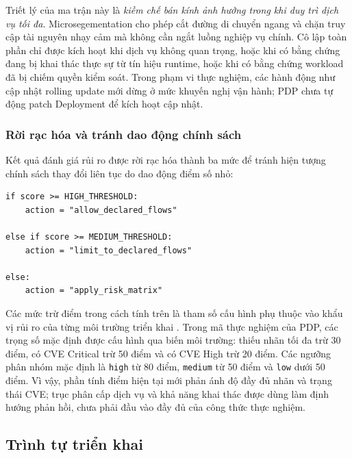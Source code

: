 Triết lý của ma trận này là \textit{kiềm chế bán kính ảnh hưởng trong khi duy trì dịch vụ tối đa}. Microsegementation cho phép cắt đường di chuyển ngang và chặn truy cập tài nguyên nhạy cảm mà không cần ngắt luồng nghiệp vụ chính. Cô lập toàn phần chỉ được kích hoạt khi dịch vụ không quan trọng, hoặc khi có bằng chứng đang bị khai thác thực sự từ tín hiệu runtime, hoặc khi có bằng chứng workload đã bị chiếm quyền kiểm soát. Trong phạm vi thực nghiệm, các hành động như cập nhật rolling update mới dừng ở mức khuyến nghị vận hành; PDP chưa tự động patch Deployment để kích hoạt cập nhật.

\subsubsection{Rời rạc hóa và tránh dao động chính sách}

Kết quả đánh giá rủi ro được rời rạc hóa thành ba mức để tránh hiện tượng chính sách thay đổi liên tục do dao động điểm số nhỏ:

\begin{listing}[H]
\begin{verbatim}
if score >= HIGH_THRESHOLD:
    action = "allow_declared_flows"

else if score >= MEDIUM_THRESHOLD:
    action = "limit_to_declared_flows"

else:
    action = "apply_risk_matrix"
\end{verbatim}
\caption{Rời rạc hóa điểm tin cậy thành hành động chính sách}
\label{lst:trust_score_policy}
\end{listing}

Các mức trừ điểm trong cách tính trên là tham số cấu hình phụ thuộc vào khẩu vị rủi ro của từng môi trường triển khai \parencite{Jeong2025,Bradatsch2023}. Trong mã thực nghiệm của PDP, các trọng số mặc định được cấu hình qua biến môi trường: thiếu nhãn tối đa trừ 30 điểm, có CVE Critical trừ 50 điểm và có CVE High trừ 20 điểm. Các ngưỡng phân nhóm mặc định là \texttt{high} từ 80 điểm, \texttt{medium} từ 50 điểm và \texttt{low} dưới 50 điểm. Vì vậy, phần tính điểm hiện tại mới phản ánh độ đầy đủ nhãn và trạng thái CVE; trục phân cấp dịch vụ và khả năng khai thác được dùng làm định hướng phản hồi, chưa phải đầu vào đầy đủ của công thức thực nghiệm.

\subsection{Trình tự triển khai}
\label{subsec:rollout}

